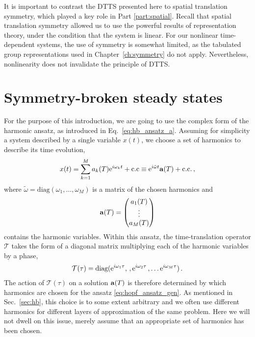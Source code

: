 It is important to contrast the DTTS presented here to spatial translation symmetry, which played a key role in Part \ref{part:spatial}. Recall that spatial translation symmetry allowed us to use the powerful results of representation theory, under the condition that the system is linear. For our nonlinear time-dependent systems, the use of symmetry is somewhat limited, as the tabulated group representations used in Chapter~\ref{ch:symmetry} do not apply. Nevertheless, nonlinearity does not invalidate the principle of DTTS. 

\section{Symmetry-broken steady states}

For the purpose of this introduction, we are going to use the complex form of the harmonic ansatz, as introduced in Eq.~\eqref{eq:hb_ansatz_a}. Assuming for simplicity a system described by a single variable $x(t)$, we choose a set of harmonics to describe its time evolution,
\begin{equation} \label{eq:hopf_ansatz_gen}
	x(t) = \sum_{k=1}^M a_{k}(T) {\rm e}^{i \omega_{k} t } + \text{c.c}  \equiv  {\rm e}^{i \tilde{\omega} t} \vb{a}(T) + \text{c.c.} \,,
\end{equation}
where $\tilde{\omega} =  \text{diag}(\omega_1, \ldots, \omega_M)$ is a matrix of the chosen harmonics and
\begin{equation} \label{eq:hopf_a}
\vb{a}(T) = \mqty(a_1(T) \\ \vdots \\ a_M(T))
\end{equation}
contains the harmonic variables. Within this ansatz, the time-translation operator $\mathcal{T}$ takes the form of a diagonal matrix multiplying each of the harmonic variables by a phase,
\begin{equation}
\mathcal{T}(\tau) = \text{diag}({\rm e}^{i \omega_1 \tau} , \,, {\rm e}^{ i \omega_2 \tau} \,, \ldots {\rm e}^{i \omega_M \tau}) \,. 
\end{equation}
The action of $\mathcal{T}(\tau)$ on a solution $\vb{a}(T)$ is therefore determined by which harmonics are chosen for the ansatz \eqref{eq:hopf_ansatz_gen}. As mentioned in Sec.~\ref{sec:hb}, this choice is to some extent arbitrary and we often use different harmonics for different layers of approximation of the same problem. Here we will not dwell on this issue, merely assume that an appropriate set of harmonics has been chosen. 

